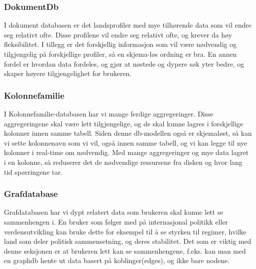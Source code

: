\subsubsection{DokumentDb}
I dokument databasen er det landsprofiler med mye tilhørende data som vil endre seg relativt ofte. Disse profilene vil endre seg relativt ofte, og krever da høy fleksibilitet. I tillegg er det forskjellig informasjon som vil være nødvendig og tilgjengelig på forskjellige profiler, så en skjema-løs ordning er bra. En annen fordel er hvordan data fordeles, og gjør at nøstede og dypere søk yter bedre, og skaper høyere tilgjengelighet for brukeren.

\subsubsection{Kolonnefamilie}
I Kolonnefamilie-databasen har vi mange ferdige aggregeringer. Disse aggregeringene skal være lett tilgjengelige, og de skal kunne lagres i forskjellige kolonner innen samme tabell. Siden denne db-modellen også er skjemaløst, så kan vi sette kolonnenavn som vi vil, også innen samme tabell, og vi kan legge til nye kolonner i real-time om nødvendig. Med mange aggregeringer og mye data lagret i en kolonne, så reduserer det de nødvendige ressursene fra disken og hvor lang tid spørringene tar.

\subsubsection{Grafdatabase}
Grafdatabasen har vi dypt relatert data som brukeren skal kunne lett se sammenhengen i. En bruker som følger med på internasjonal politikk eller verdensutvikling kan bruke dette for eksempel til å se styrken til regimer, hvilke land som deler politisk sammensetning, og deres stabilitet. Det som er viktig med denne seksjonen er at brukeren lett kan se sammenhengene, f.eks. kan man med en graphdb hente ut data basert på koblinger(edges), og ikke bare nodene.




